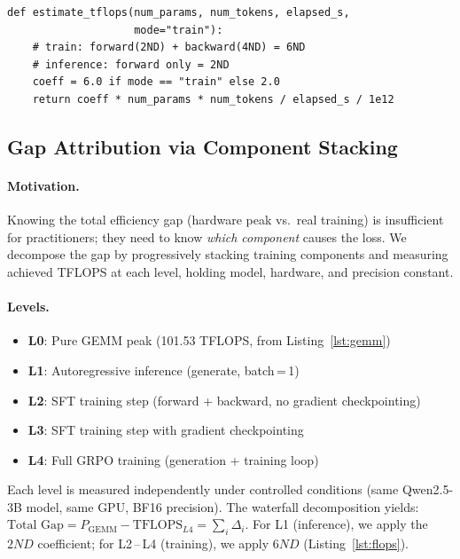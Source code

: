 \begin{lstlisting}[caption={FLOPS estimation for training vs.\ inference.},label={lst:flops}]
def estimate_tflops(num_params, num_tokens, elapsed_s,
                    mode="train"):
    # train: forward(2ND) + backward(4ND) = 6ND
    # inference: forward only = 2ND
    coeff = 6.0 if mode == "train" else 2.0
    return coeff * num_params * num_tokens / elapsed_s / 1e12
\end{lstlisting}

\subsection{Gap Attribution via Component Stacking}
\label{sec:gap-attribution}

\paragraph{Motivation.} Knowing the total efficiency gap (hardware peak vs.\ real training) is insufficient for practitioners; they need to know \emph{which component} causes the loss. We decompose the gap by progressively stacking training components and measuring achieved TFLOPS at each level, holding model, hardware, and precision constant.

\paragraph{Levels.}
\begin{itemize}
    \item \textbf{L0}: Pure GEMM peak (101.53 TFLOPS, from Listing~\ref{lst:gemm})
    \item \textbf{L1}: Autoregressive inference (generate, batch\,=\,1)
    \item \textbf{L2}: SFT training step (forward + backward, no gradient checkpointing)
    \item \textbf{L3}: SFT training step with gradient checkpointing
    \item \textbf{L4}: Full GRPO training (generation + training loop)
\end{itemize}

\noindent Each level is measured independently under controlled conditions (same Qwen2.5-3B model, same GPU, BF16 precision). The waterfall decomposition yields: $\text{Total Gap} = P_{\text{GEMM}} - \text{TFLOPS}_{L4} = \sum_i \Delta_i$. For L1 (inference), we apply the $2ND$ coefficient; for L2\,--\,L4 (training), we apply $6ND$ (Listing~\ref{lst:flops}).

